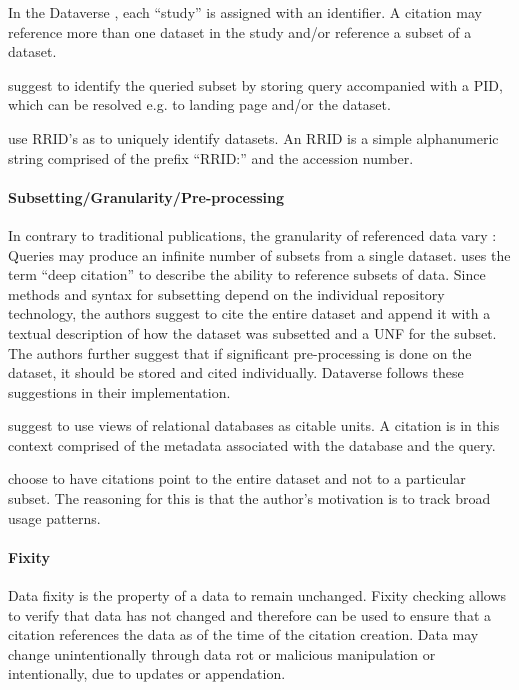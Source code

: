 \documentclass[a4paper,10pt]{article}
\begin{document}
In the Dataverse \cite{Crosas2011}, each ``study'' is assigned with an identifier. A citation may reference more than one dataset in the study and/or reference a subset of a dataset.

\citep{Rauber2015} suggest to identify the queried subset by storing query accompanied with a \gls{PID}, which can be resolved e.g. to landing page and/or the dataset.

\citep{Bandrowski2016} use RRID's as to uniquely identify datasets. An RRID is a simple alphanumeric string comprised of the prefix ``RRID:'' and the accession number. 

\paragraph{Subsetting/Granularity/Pre-processing}
In contrary to traditional publications, the granularity of referenced data vary \cite{Davidson2017}: Queries may produce an infinite number of subsets from a single dataset.
\citep{AltKin07} uses the term ``deep citation'' to describe the ability to reference subsets of data. Since methods and syntax for subsetting depend on the individual repository technology, the authors suggest to cite the entire dataset and append it with a textual description of how the dataset was subsetted and a \gls{UNF} for the subset. The authors further suggest that if significant pre-processing is done on the dataset, it should be stored and cited individually. Dataverse follows these suggestions in their implementation.

\citep{Buneman2016} suggest to use views of relational databases as citable units. A citation is in this context comprised of the metadata associated with the database and the query.

\citep{Bandrowski2016} choose to have citations point to the entire dataset and not to a particular subset. The reasoning for this is that the author's motivation is to track broad usage patterns.


\paragraph{Fixity}
Data fixity is the property of a data to remain unchanged. 
Fixity checking allows to verify that data has not changed and therefore can be used to ensure that a citation references the data as of the time of the citation creation.
Data may change unintentionally through data rot or malicious manipulation or intentionally, due to updates or appendation. 
\end{document}
